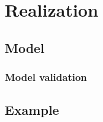 \chapter{Realization}
\label{chapter:realisierung}
\section{Model}
\subsection{Model validation}
\section{Example}
